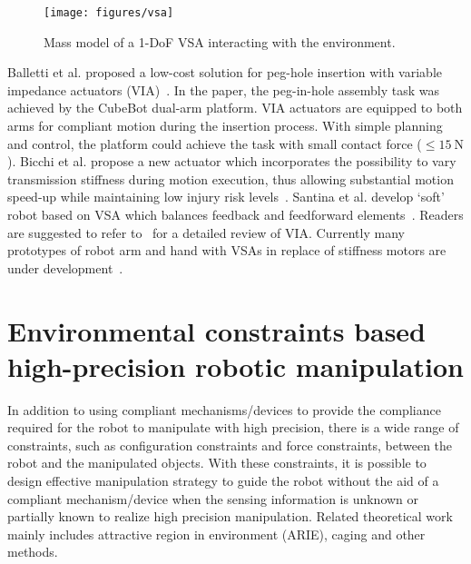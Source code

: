 \documentclass[journal,twoside,web]{ieeecolor}
\begin{document}
\begin{figure}[htb]
    \centering
    \texttt{[image: figures/vsa]}
    \caption{Mass model of a 1-DoF VSA interacting with the environment.}
    \label{fig:vsa}
\end{figure}

Balletti et al. proposed a low-cost solution for peg-hole insertion with variable impedance actuators (VIA)~\cite{Balletti2012}. In the paper, the peg-in-hole assembly task was achieved by the CubeBot dual-arm platform. VIA actuators are equipped to both arms for compliant motion during the insertion process. With simple planning and control, the platform could achieve the task with small contact force ($\le \SI{15}{\newton}$).
Bicchi et al. propose a new actuator which incorporates the possibility to vary transmission stiffness during motion execution, thus allowing substantial motion speed-up while maintaining low injury risk levels~\cite{Bicchi2005}.
Santina et al. develop `soft' robot based on VSA which balances feedback and feedforward elements~\cite{Della2017}.
Readers are suggested to refer to~\cite{Wolf2016} for a detailed review of VIA.
Currently many prototypes of robot arm and hand with VSAs in replace of stiffness motors are under development~\cite{Zheng2016,Rice2018,Haas2018}.

\section{Environmental constraints based high-precision robotic manipulation}
\label{sec:compliant_env}

In addition to using compliant mechanisms/devices to provide the compliance required for the robot to manipulate with high precision, there is a wide range of constraints, such as configuration constraints and force constraints, between the robot and the manipulated objects. 
With these constraints, it is possible to design effective manipulation strategy to guide the robot without the aid of a compliant mechanism/device when the sensing information is unknown or partially known to realize high precision manipulation. 
Related theoretical work mainly includes attractive region in environment (ARIE), caging and other methods.

\end{document}
